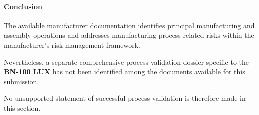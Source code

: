 
\paragraph{Conclusion}

The available manufacturer documentation identifies principal
manufacturing and assembly operations and addresses
manufacturing-process-related risks within the manufacturer's
risk-management framework.

Nevertheless, a separate comprehensive process-validation dossier
specific to the \textbf{BN-100 LUX} has not been identified among
the documents available for this submission.

No unsupported statement of successful process validation is
therefore made in this section.

